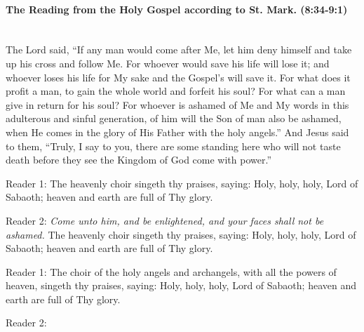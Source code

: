 \documentclass[twoside, letterpaper, 12pt]{report}
\begin{document}


\paragraph{The Reading from the Holy Gospel according to St. Mark. (8:34-9:1)}\mbox{}\\

The Lord said, “If any man would come after Me, let him deny himself and take up his
cross and follow Me. For whoever would save his life will lose it; and whoever loses his life for
My sake and the Gospel’s will save it. For what does it profit a man, to gain the whole world and
forfeit his soul? For what can a man give in return for his soul? For whoever is ashamed of Me
and My words in this adulterous and sinful generation, of him will the Son of man also be ashamed,
when He comes in the glory of His Father with the holy angels.” And Jesus said to them, “Truly,
I say to you, there are some standing here who will not taste death before they see the Kingdom of
God come with power.”


\begin{reader}
\item[Reader 1:] The heavenly choir singeth thy praises, saying:
  Holy, holy, holy, Lord of Sabaoth; heaven and earth are full of Thy glory.

\item[Reader 2:] \emph{Come unto him, and be enlightened,
               and your faces shall not be ashamed.}
  The heavenly choir singeth thy praises, saying:
  Holy, holy, holy, Lord of Sabaoth; heaven and earth are full of Thy glory.

\item[Reader 1:] \emph{\glory}
  The choir of the holy angels and archangels,
  with all the powers of heaven, singeth thy praises, saying:
  Holy, holy, holy, Lord of Sabaoth; heaven and earth are full of Thy glory.

\item[Reader 2:]\emph{\nowandever}
\end{reader}




\end{document}
